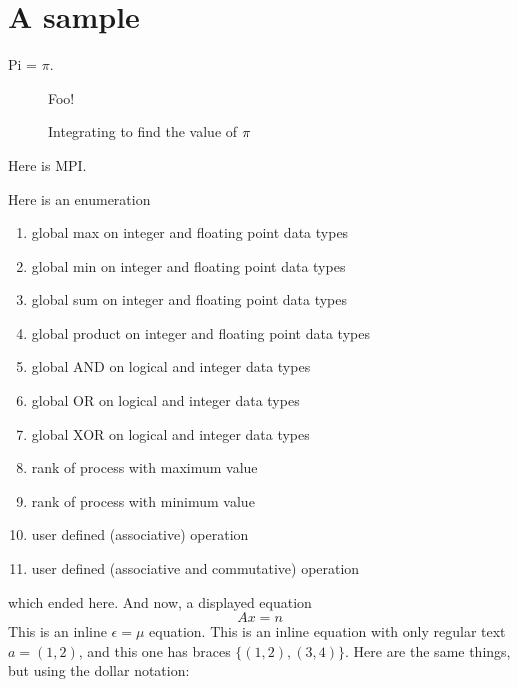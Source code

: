 \newcommand{\commentOut}[1]{{}}
\newcommand{\FooBar}{{}}

\def\MPI/{MPI}


\section{A sample}\label{Sample-doc}

Pi = \( \pi \).

\begin{figure}[htbp]
    \centerline{Foo!}
    \caption{Integrating to find the value of \protect\( \pi \protect\)}
    \label{fig:pi}
\end{figure}

Here is \MPI/.
\commentOut{
\begin{verbatim}
           First Execution

    0             1               2
                        /-----  send
                recv <-/
broadcast     broadcast       broadcast
  send ---\
           \--> recv
\end{verbatim}

\begin{verbatim}
           Second Execution

   0              1               2
broadcast
  send ---\
           \-->  recv
               broadcast       broadcast
                           /---  send
                 recv <---/
\end{verbatim}
} %

Here is an enumeration
\begin{enumerate}
\item[] global max on integer and floating point data types
\item[] global min on integer and floating point data types
\item[] global sum on integer and floating point data types
\item[] global product on integer and floating point data types
\item[] global AND on logical and integer data types
\item[] global OR on logical and integer data types
\item[] global XOR on logical and integer data types
\item[] rank of process with maximum value
\item[] rank of process with minimum value
\item[] user defined (associative) operation
\item[] user defined (associative and commutative) operation
\end{enumerate}
which ended here.  And now, a displayed equation
\[
A x = n
\]
This is an inline \( \epsilon = \mu \) equation.  This is an inline equation
with only regular text \( a = ( 1,2 ) \), and this one has braces \( \{ (1,2),
(3,4)\} \).  Here are the same things, but using the dollar notation:

